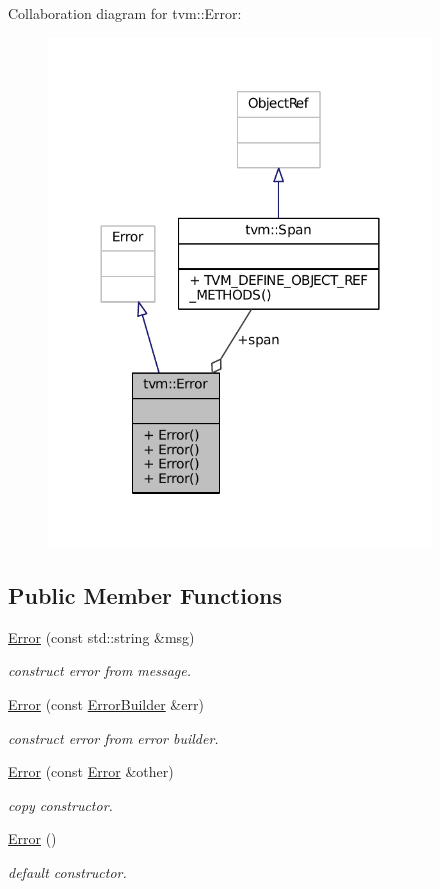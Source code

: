 Collaboration diagram for tvm\+:\+:Error\+:
\nopagebreak
\begin{figure}[H]
\begin{center}
\leavevmode
\includegraphics[width=288pt]{classtvm_1_1Error__coll__graph}
\end{center}
\end{figure}
\subsection*{Public Member Functions}
\begin{DoxyCompactItemize}
\item 
\hyperlink{classtvm_1_1Error_a34fb93ad5e30fb0ba2d29557e3888cad}{Error} (const std\+::string \&msg)
\begin{DoxyCompactList}\small\item\em construct error from message. \end{DoxyCompactList}\item 
\hyperlink{classtvm_1_1Error_a4e6ed7f9bfe3a8b9e9fd707333d9a271}{Error} (const \hyperlink{structtvm_1_1ErrorBuilder}{Error\+Builder} \&err)
\begin{DoxyCompactList}\small\item\em construct error from error builder. \end{DoxyCompactList}\item 
\hyperlink{classtvm_1_1Error_ae795782b25b3d8861eba48ac126075f6}{Error} (const \hyperlink{classtvm_1_1Error}{Error} \&other)
\begin{DoxyCompactList}\small\item\em copy constructor. \end{DoxyCompactList}\item 
\hyperlink{classtvm_1_1Error_af24ae3b0fbb989c6fe282ef0571eb8de}{Error} ()
\begin{DoxyCompactList}\small\item\em default constructor. \end{DoxyCompactList}\end{DoxyCompactItemize}
